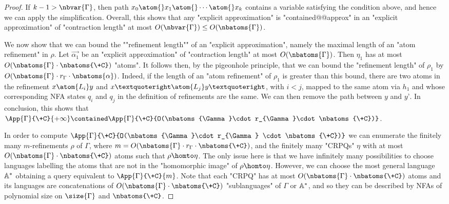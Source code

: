 \begin{proof}
	If $k-1>\nbvar{\Gamma}$, then path $x_0 \atom{} x_1 \atom{} \cdots \atom{} x_k$ contains a variable satisfying the condition above, and hence we can apply the simplification. Overall, this shows that any "explicit approximation" is "contained@@approx"
	in an "explicit approximation" of "contraction length" at most
	$O(\nbvar{\Gamma})\leq O(\nbatoms{\Gamma})$.

	We now show that we can bound the \AP""refinement length"" of an "explicit approximation",
	namely the maximal length of an "atom refinement" in $\rho$.
	Let $\vec{\alpha_1}$ be an "explicit approximation" of "contraction length" at most
	$O(\nbatoms{\Gamma})$. Then $\eta_1$ has at most $O(\nbatoms{\Gamma}\cdot\nbatoms{\+C})$
	"atoms". It follows then, by the pigeonhole principle, that we can bound the
	"refinement length" of $\rho_1$ by $O(\nbatoms{\Gamma}\cdot r_{\Gamma}\cdot\nbatoms{\alpha})$. Indeed, if the length of an "atom refinement" of $\rho_1$  is greater than this bound, there are two  atoms in the refinement $x\atom{L_i} y$ and  $x’\atom{L_j} y’$, with $i<j$, mapped to the same atom via $h_1$ and whose corresponding NFA states $q_i$ and $q_j$ in the definition of refinements are the same. We can then remove the path between $y$ and $y’$.
	In conclusion, this shows that $\App{\Gamma}{\+C}{+\infty} \contained \App{\Gamma}{\+C}{O(\nbatoms{\Gamma}\cdot r_{\Gamma}\cdot \nbatoms{\+C})}$.

	In order to compute $\App{\Gamma}{\+C}{O(\nbatoms{\Gamma}\cdot r_{\Gamma} \cdot \nbatoms{\+C})}$ we can enumerate the finitely many $m$-refinements $\rho$ of $\Gamma$, where $m=O(\nbatoms{\Gamma}\cdot r_{\Gamma} \cdot \nbatoms{\+C})$, and the finitely many "CRPQs"  $\eta$ with at most $O(\nbatoms{\Gamma} \cdot \nbatoms{\+C})$ atoms such that $\rho\homto \eta$. The only issue here is that we have infinitely many possibilities to choose languages labelling the atoms that are not in the "homomorphic image" of $\rho \homto \eta$. However, we can  choose the most general language $\mathbb{A}^*$ obtaining a query equivalent to $\App{\Gamma}{\+C}{m}$. 
	Note that each "CRPQ" has at most $O(\nbatoms{\Gamma} \cdot \nbatoms{\+C})$ atoms and its languages are concatenations of
	 $O(\nbatoms{\Gamma} \cdot \nbatoms{\+C})$ "sublanguages" of $\Gamma$ or $\mathbb{A}^*$, and
	so they can be described by NFAs of polynomial size on $\size{\Gamma}$ and $\nbatoms{\+C}$.
\end{proof}

